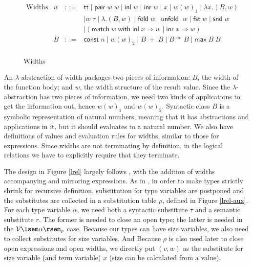 \documentclass[preprint]{sigplanconf}
\newcommand{\symmatch}{\mathsf{match}}
\newcommand{\symwith}{\mathsf{\;with\;}}
\newcommand{\syminl}{\mathsf{inl}}
\newcommand{\syminr}{\mathsf{inr}}
\newcommand{\symmax}{\mathsf{max}}
\newcommand{\symfold}{\mathsf{fold\;}}
\newcommand{\symunfold}{\mathsf{unfold\;}}
\newcommand{\sympair}{\mathsf{pair}}
\newcommand{\symtt}{\mathsf{tt}}
\newcommand{\relV}[1]{\mathcal{V}\lsem#1\rsem}
\newcommand{\symfst}{\mathsf{fst}}
\newcommand{\symsnd}{\mathsf{snd}}
\begin{document}
\begin{figure}
$$\begin{array}{rrcl}
  \textrm{Widths} & w &::=& \symtt \mid \sympair\;w\;w \mid \syminl\;w \mid \syminr\;w \mid x \mid w(w)_1 \mid \lambda x.(B,w) \\
  & & & \mid w\;\tau \mid \lambda.(B,w) \mid \symfold w \mid \symunfold\;w \mid \symfst\;w \mid \symsnd\;w \\
  & & & \mid (\symmatch\;w \symwith\syminl\;x\Rightarrow w\;|\;\syminr\;x\Rightarrow w) \\
  & B &::=& \mathsf{const}\;n \mid w(w)_2 \mid B\;+\;B \mid B\;*\;B \mid \symmax\;B\;B \\
\end{array}$$
\caption{\label{widths}Widths}
\end{figure}

An $\lambda$-abstraction of width packages two pieces of information: $B$, the width of the function body; and $w$, the width structure of the result value. Since the $\lambda$-abstraction has two pieces of information, we need two kinds of applications to get the information out, hence $w(w)_1$ and $w(w)_2$. Syntactic class $B$ is a symbolic representation of natural numbers, meaning that it has abstractions and applications in it, but it should evaluates to a natural number. We also have definitions of values and evaluation rules for widths, similar to those for expressions. Since widths are not terminating by definition, in the logical relations we have to explicitly require that they terminate.

The design in Figure \ref{lrel} largely follows \cite{dreyer2009logical}, with the addition of widths accompanying and mirroring expressions. As in \cite{dreyer2009logical}, in order to make types strictly shrink for recursive definition, substitution for type variables are postponed and the substitutes are collected in a substitution table $\rho$, defined in Figure \ref{lrel-aux}. For each type variable $\alpha$, we need both a syntactic substitute $\tau$ and a semantic substitute $r$. The former is needed to close an open type; the latter is needed in the $\relV{\alpha}_\rho$ case. Because our types can have size variables, we also need to collect substitutes for size variables. And Because $\rho$ is also used later to close open expressions and open widths, we directly put $(v,w)$ as the substitute for size variable (and term variable) $x$ (size can be calculated from a value).
\end{document}

